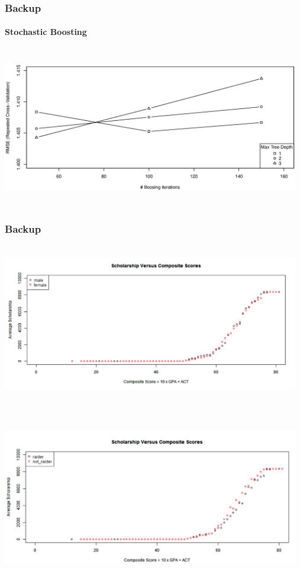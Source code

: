 \documentclass[aspectratio=169]{beamer}
\begin{document}
\begin{frame}
\frametitle{Backup}
\framesubtitle{Stochastic Boosting}
\includegraphics[width=13cm, height=7cm, scale = 0.5]
{pic/Stochastic_boositing.eps}
\end{frame}


\begin{frame}
\frametitle{Backup}
\includegraphics[width=13cm, height=7cm, scale = 0.5]
{pic/gender.png}
\end{frame}



\begin{frame}
\frametitle{}
\includegraphics[width=13cm, height=7cm, scale = 0.5]
{pic/Raider.png}
\end{frame}
\end{document}
